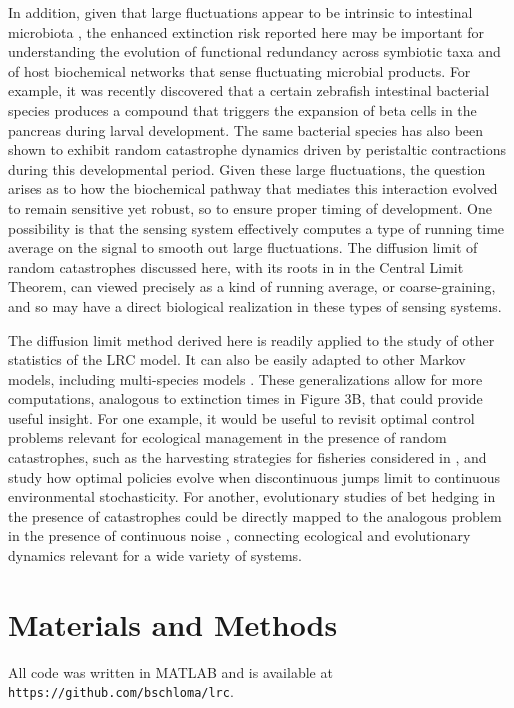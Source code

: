 In addition, given that large fluctuations appear to be intrinsic to intestinal microbiota \cite{trosvik2015biotic, caporaso2011moving,wiles_host_2016}, the enhanced extinction risk reported here may be important for understanding the evolution of functional redundancy across symbiotic taxa and of host biochemical networks that sense fluctuating microbial products.  For example, it was recently discovered that a certain zebrafish intestinal bacterial species produces a compound that triggers the expansion of beta cells in the pancreas \cite{Hill2016} during larval development.  The same bacterial species has also been shown to exhibit random catastrophe dynamics driven by peristaltic contractions \cite{wiles_host_2016} during this developmental period.  Given these large fluctuations, the question arises as to how the biochemical pathway that mediates this interaction evolved to remain sensitive yet robust, so to ensure proper timing of development.  One possibility is that the sensing system effectively computes a type of running time average on the signal to smooth out large fluctuations.  The diffusion limit of random catastrophes discussed here, with its roots in in the Central Limit Theorem, can viewed precisely as a kind of running average, or coarse-graining, and so may have a direct biological realization in these types of sensing systems.

The diffusion limit method derived here is readily applied to the study of other statistics of the LRC model.  It can also be easily adapted to other Markov models, including multi-species models \cite{bao2011competitive,jacod2013limit}. These generalizations allow for more computations, analogous to extinction times in Figure 3B, that could provide useful insight.  For one example, it would be useful to revisit optimal control problems relevant for ecological management in the presence of random catastrophes, such as the harvesting strategies for fisheries considered in \cite{hanson1998optimal}, and study how optimal policies evolve when discontinuous jumps limit to continuous environmental stochasticity.  For another, evolutionary studies of bet hedging in the presence of catastrophes \cite{visco2010switching}  could be directly mapped to the analogous problem in the presence of continuous noise \cite{melbingerSREP_2015}, connecting ecological and evolutionary dynamics relevant for a wide variety of systems.

\section{Materials and Methods}
 \noindent All code was written in MATLAB and is available at \texttt{https://github.com/bschloma/lrc}.
 
